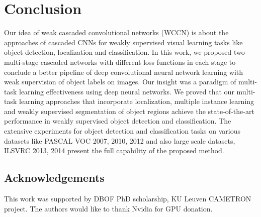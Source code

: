 \documentclass[10pt,twocolumn,letterpaper]{article}
\begin{document}
\section{Conclusion}
Our idea of weak cascaded convolutional networks (WCCN) is about the approaches of cascaded CNNs for weakly supervised visual learning tasks like object detection, localization and classification. In this work, we proposed two multi-stage cascaded networks with different loss functions in each stage to conclude a better pipeline of deep convolutional neural network learning with weak supervision of object labels on images. Our insight was a paradigm of multi-task learning effectiveness using deep neural networks. We proved that our multi-task learning approaches that incorporate localization, multiple instance learning and weakly supervised segmentation of object regions achieve the state-of-the-art performance in weakly supervised object detection and classification. The extensive experiments for object detection and classification tasks on various datasets like PASCAL VOC 2007, 2010, 2012 and also large scale datasets, ILSVRC 2013, 2014 present the full capability of the proposed method.

\subsection*{Acknowledgements}
This work was supported by DBOF PhD scholarship, KU Leuven CAMETRON project. The authors would like to thank Nvidia for GPU donation.

{\small


}
\end{document}
